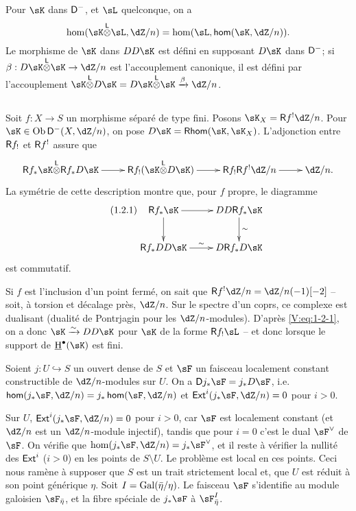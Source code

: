 Pour $\sK$ dans $\mathsf{D}^-$, et $\sL$ quelconque, on a 
\[
  \hom(\sK\lotimes \sL,\dZ/n) = \hom(\sL,\Hom(\sK,\dZ/n)) \text{.}
\]
Le morphisme de $\sK$ dans $DD\sK$ est d\'efini en supposant $D\sK$ dans 
$\mathsf{D}^-$; si $\beta:D\sK\lotimes\sK\to \dZ/n$ est l'accouplement canonique, il 
est d\'efini par l'accouplement 
$\sK\lotimes D\sK=D\sK\lotimes \sK \xrightarrow\beta \dZ/n$. 





\subsection{}\label{V:1-2}

Soit $f:X\to S$ un morphisme s\'epar\'e de type fini. Posons 
$\sK_X=\R f^!\dZ/n$. Pour $\sK\in \ob\D^-(X,\dZ/n)$, on pose 
$D\sK = \rHom(\sK,\sK_X)$. L'adjonction entre $\mathsf{R} f_!$ et $\mathsf{R} f^!$ 
assure que 
\[\xymatrix{
  \R f_\ast \sK\lotimes \R f_\ast D\sK \ar[r] 
    & \R f_! (\sK\lotimes D\sK) \ar[r] 
    & \R f_! \R f^! \dZ/n \ar[r] 
    & \dZ/n \text{.}
}\]
La sym\'etrie de cette description montre que, pour $f$ propre, le diagramme 
\begin{equation*}\tag{1.2.1}\label{V:eq:1-2-1}
\xymatrix{
  \R f_\ast \sK \ar[r] \ar[d] 
    & D D \R f_\ast \sK \ar[d]^-\sim \\
  \R f_\ast D D \sK \ar[r]^\sim 
    & D\R f_\ast D\sK
}
\end{equation*}
est commutatif. 

Si $f$ est l'inclusion d'un point ferm\'e, on sait que 
$\R f^!\dZ/n=\dZ/n(-1)[-2]$ -- soit, \`a torsion et d\'ecalage pr\`es, $\dZ/n$. 
Sur le spectre d'un coprs, ce complexe est dualisant (dualit\'e de Pontrjagin 
pour les $\dZ/n$-modules). D'apr\`es \eqref{V:eq:1-2-1}, on a donc 
$\sK\iso D D\sK$ pour $\sK$ de la forme $\R f_!\sL$ -- et donc lorsque le 
support de $\underline\h^\bullet(\sK)$ est fini. 





\begin{theorem_}\label{V:1-3}
Soient $j:U\hookrightarrow S$ un ouvert dense de $S$ et $\sF$ un faisceau 
localement constant constructible de $\dZ/n$-modules sur $U$. On a 
$\D j_\ast \sF = j_\ast D \sF$, i.e. $\Hom(j_\ast \sF,\dZ/n) = j_\ast\Hom(\sF,\dZ/n)$ et $\Ext^i(j_\ast\sF,\dZ/n) = 0$ pour $i>0$.
\end{theorem_}

Sur $U$, $\Ext^i(j_\ast\sF,\dZ/n)=0$ pour $i>0$, car $\sF$ est localement 
constant (et $\dZ/n$ est un $\dZ/n$-module injectif), tandis que pour $i=0$ 
c'est le dual $\sF^\vee$ de $\sF$. On v\'erifie que 
$\hom(j_\ast\sF,\dZ/n)=j_\ast\sF^\vee$, et il reste \`a v\'erifier la nullit\'e 
des $\operatorname{\mathsf{Ext}}^i$ ($i>0$) en les points de $S\setminus U$. Le probl\`eme est local 
en ces points. Ceci nous ram\`ene \`a supposer que $S$ est un trait strictement 
local et, que $U$ est r\'eduit \`a son point g\'en\'erique $\eta$. Soit 
$I=\operatorname{Gal}(\bar\eta/\eta)$. Le faisceau $\sF$ s'identifie au module galoisien 
$\sF_{\bar\eta}$, et la fibre sp\'eciale de $j_\ast \sF$ \`a 
$\sF_{\bar\eta}^I$. 

